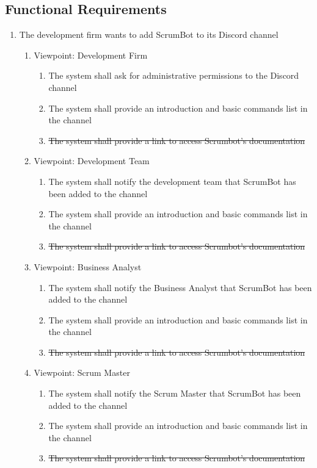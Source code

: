 \documentclass[12pt, titlepage]{article}
\begin{document}
\subsection{Functional Requirements}
\begin{enumerate}[{BE}1.]
    \item The development firm wants to add ScrumBot to its Discord channel
    \begin{enumerate}[{VP}1.]
        \item Viewpoint: Development Firm
            \begin{enumerate}
                \item The system shall ask for administrative permissions to the Discord channel
                \item The system shall provide an introduction and basic commands list in the channel
                \item \sout{The system shall provide a link to access Scrumbot's documentation}
            \end{enumerate}
        \item Viewpoint: Development Team
            \begin{enumerate}
                \item The system shall notify the development team that ScrumBot has been added to the channel
                \item The system shall provide an introduction and basic commands list in the channel
                \item \sout{The system shall provide a link to access Scrumbot's documentation}
            \end{enumerate}
            
        \item Viewpoint: Business Analyst
            \begin{enumerate}
                \item The system shall notify the Business Analyst that ScrumBot has been added to the channel
                \item The system shall provide an introduction and basic commands list in the channel
                \item \sout{The system shall provide a link to access Scrumbot's documentation}
            \end{enumerate}
            
        \item Viewpoint: Scrum Master
            \begin{enumerate}
                \item The system shall notify the Scrum Master that ScrumBot has been added to the channel
                \item The system shall provide an introduction and basic commands list in the channel
                \item \sout{The system shall provide a link to access Scrumbot's documentation}
            \end{enumerate}
    \end{enumerate}


\end{enumerate}
\end{document}
